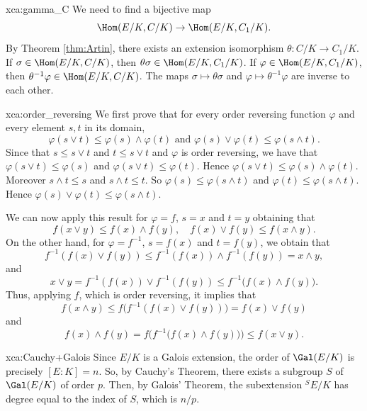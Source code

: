 \begin{sol}{xca:gamma_C}
We need to find a bijective map 
\[
\Hom(E/K,C/K)\to\Hom(E/K,C_1/K).
\]
By Theorem \ref{thm:Artin}, there exists an extension isomorphism $\theta:C/K \to C_1/K$. If $\sigma\in\Hom(E/K,C/K)$, then $\theta\sigma\in\Hom(E/K,C_1/K)$. 
If $\varphi\in\Hom(E/K,C_1/K)$, then $\theta^{-1}\varphi\in\Hom(E/K,C/K)$. The 
maps $\sigma\mapsto\theta\sigma$ and 
$\varphi\mapsto\theta^{-1}\varphi$ are inverse to each other. 
\end{sol}

\begin{sol}{xca:order_reversing}
    We first prove that for every order
    reversing function $\varphi$
    and every element $s,t$ in its domain,
    \[
    \varphi(s\vee t)\leq \varphi(s)\wedge \varphi(t) \text{ and }
    \varphi(s)\vee \varphi(t)\leq \varphi(s\wedge t).
    \]
    Since that $s\leq s\vee t$
    and $t\leq s\vee t$ and $\varphi$
    is order reversing,
    we have that $\varphi(s\vee t)\leq \varphi(s)$ 
    and $\varphi(s\vee t)\leq \varphi(t)$.
    Hence $\varphi(s\vee t)\leq \varphi(s)\wedge \varphi(t).$
    Moreover $s\wedge t\leq s$
    and $s\wedge t\leq t$.
    So $\varphi(s)\leq \varphi(s\wedge t)$ and $\varphi(t)\leq \varphi(s\wedge t)$.
    Hence 
    $\varphi(s)\vee \varphi(t)\leq \varphi(s\wedge t).$

    We can now apply this result
    for $\varphi=f$, $s=x$ and $t=y$
    obtaining that
    \[
    f(x\vee y)\leq f(x)\wedge f(y), \quad
    f(x)\vee f(y)\leq f(x\wedge y).
    \]
    On the other hand, for $\varphi=f^{-1}$, 
    $s=f(x)$ and $t=f(y)$,
    we obtain that 
    \[
    f^{-1}(f(x)\vee f(y))\leq
    f^{-1}(f(x))\wedge f^{-1}(f(y))=
    x\wedge y,
    \]
    and
    \[
    x\vee y=f^{-1}(f(x))\vee f^{-1}(f(y))\leq f^{-1}\big(f(x)\wedge f(y)\big).
    \]
    Thus, applying $f$, which is order reversing,
    it implies that 
    \[
    f(x\wedge y)\leq f\big(f^{-1}(f(x)\vee f(y))\big)=
    f(x)\vee f(y)
    \]
    and
    \[
    f(x)\wedge f(y)=f\big(f^{-1}\big(f(x)\wedge f(y)\big)\big)\leq f(x\vee y).
    \]
 \end{sol}

 \begin{sol}{xca:Cauchy+Galois}
     Since $E/K$ is a Galois extension,
     the order of $\Gal(E/K)$ is precisely $[E:K]=n$.
     So, by Cauchy's Theorem, there exists a subgroup $S$ 
     of $\Gal(E/K)$
     of order $p$.
     Then, by Galois' Theorem, the subextension
     ${}^SE/K$
     has degree equal to the index of $S$,
     which is $n/p$.
 \end{sol}


